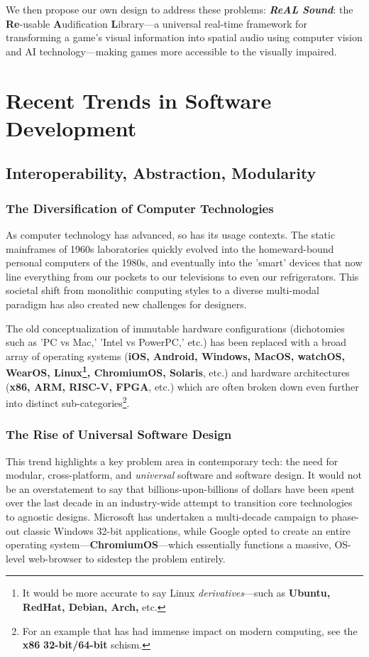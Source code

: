 \documentclass{report}
\newcommand{\rs}{ReAL Sound\xspace}
\newcommand{\rsfull}{\textbf{Re}-usable \textbf{A}udification \textbf{L}ibrary\xspace}
\newcommand{\tech}[1]{\textbf{#1}}
\begin{document}
We then propose our own design to address these problems: \emph{\textbf{\rs}}: the \rsfull---a universal real-time framework for transforming a game's visual information into spatial audio using computer vision and AI technology---making games more accessible to the visually impaired.    

\section{Recent Trends in Software Development}
\subsection{Interoperability, Abstraction, Modularity}

\subsubsection{The Diversification of Computer Technologies}
As computer technology has advanced, so has its usage contexts. The static mainframes of 1960s laboratories quickly evolved into the homeward-bound personal computers of the 1980s, and eventually into the 'smart' devices that now line everything from our pockets to our televisions to even our refrigerators. This societal shift from monolithic computing styles to a diverse multi-modal paradigm has also created new challenges for designers. 

The old conceptualization of immutable hardware configurations (dichotomies such as 'PC vs Mac,' 'Intel vs PowerPC,' etc.) has been replaced with a broad array of operating systems (\tech{iOS, Android, Windows, MacOS, watchOS, WearOS, Linux\footnote{It would be more accurate to say Linux \emph{derivatives}---such as \tech{Ubuntu, RedHat, Debian, Arch,} etc.}, ChromiumOS, Solaris}, etc.) and hardware architectures (\tech{x86, ARM, RISC-V, FPGA}, etc.) which are often broken down even further into distinct sub-categories\footnote{For an example that has had immense impact on modern computing, see the \tech{x86} \tech{32-bit/64-bit} schism.}.


\subsubsection{The Rise of Universal Software Design}

This trend highlights a key problem area in contemporary tech: the need for modular, cross-platform, and \emph{universal} software and software design. It would not be an overstatement to say that billions-upon-billions of dollars have been spent over the last decade in an industry-wide attempt to transition core technologies to agnostic designs. Microsoft has undertaken a multi-decade campaign to phase-out classic Windows 32-bit applications\cite{Foley_2020}, while Google opted to create an entire operating system---\tech{ChromiumOS}---which essentially functions a massive, OS-level web-browser to sidestep the problem entirely\cite{chrome}. 
\end{document}
